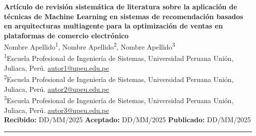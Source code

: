 \documentclass[12pt, a4paper]{article}
\begin{document}

\begin{center}
  {\LARGE\bfseries\color{azulPrincipal}
    Art\'iculo de revisi\'on sistem\'atica de literatura sobre
    la aplicaci\'on de t\'ecnicas de Machine Learning en sistemas
    de recomendaci\'on basados en arquitecturas multiagente para
    la optimizaci\'on de ventas en plataformas de comercio
    electr\'onico}\\[1em]

  {\large
    Nombre Apellido\textsuperscript{1},\quad
    Nombre Apellido\textsuperscript{2},\quad
    Nombre Apellido\textsuperscript{3}}\\[0.5em]

  {\small
    \textsuperscript{1}Escuela Profesional de Ingenier\'ia de Sistemas,
    Universidad Peruana Uni\'on, Juliaca, Per\'u.
    \href{mailto:autor1@upeu.edu.pe}{autor1@upeu.edu.pe}\\
    \textsuperscript{2}Escuela Profesional de Ingenier\'ia de Sistemas,
    Universidad Peruana Uni\'on, Juliaca, Per\'u.
    \href{mailto:autor2@upeu.edu.pe}{autor2@upeu.edu.pe}\\
    \textsuperscript{3}Escuela Profesional de Ingenier\'ia de Sistemas,
    Universidad Peruana Uni\'on, Juliaca, Per\'u.
    \href{mailto:autor3@upeu.edu.pe}{autor3@upeu.edu.pe}}\\[0.8em]

  {\small\textbf{Recibido:} DD/MM/2025\quad
         \textbf{Aceptado:} DD/MM/2025\quad
         \textbf{Publicado:} DD/MM/2025}
\end{center}

\vspace{0.5em}\noindent\rule{\linewidth}{1pt}

\end{document}
